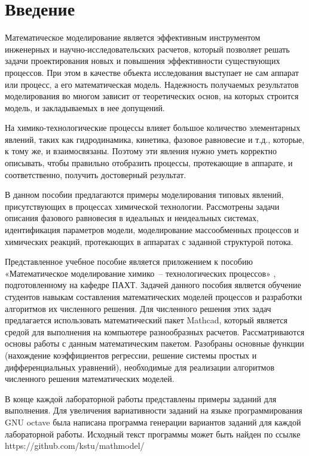 \section*{Введение}
Математическое моделирование является эффективным ин\-стру\-мен\-том инженерных и научно-исследовательских расчетов, который позволяет решать задачи проектирования новых и повышения эффективности существующих процессов. При этом в качестве объекта исследования выступает не сам аппарат или процесс, а его математическая модель. Надежность получаемых результатов моделирования во многом зависит от теоретических основ, на которых строится модель, и закладываемых в нее допущений.

На химико-технологические процессы влияет большое количество элементарных явлений, таких как гидродинамика, кинетика, фазовое равновесие и т.д., которые, к тому же, и взаимосвязаны. Поэтому эти явления нужно уметь корректно описывать, чтобы правильно отобразить процессы, протекающие в аппарате, и соответственно, получить достоверный результат.

В данном пособии предлагаются примеры моделирования типовых явлений, присутствующих в процессах химической технологии. Рассмотрены задачи описания фазового равновесия в идеальных и неидеальных системах, идентификация параметров модели, моделирование массообменных процессов и химических реакций, протекающих в аппаратах с заданной структурой потока.

Представленное учебное пособие является приложением к пособию «Математическое моделирование химико~-- технологических процессов» \cite{klinov-mm2009}, подготовленному на кафедре ПАХТ. Задачей данного пособия является обучение студентов навыкам составления математических моделей процессов и разработки алгоритмов их численного решения. Для численного решения этих задач предлагается использовать математический пакет Mathcad, который является средой для выполнения на компьютере разнообразных расчетов. Рассматриваются основы работы с данным математическим пакетом. Разобраны основные функции (нахождение коэффициентов регрессии, решение системы простых и дифференциальных уравнений), необходимые для реализации алгоритмов численного решения математических моделей.

В конце каждой лабораторной работы представлены примеры заданий для выполнения. Для увеличения вариативности заданий на языке программирования GNU octave была написана программа генерации вариантов заданий для каждой лабораторной работы. Исходный текст программы может быть найден по ссылке https://github.com/kstu/mathmodel/